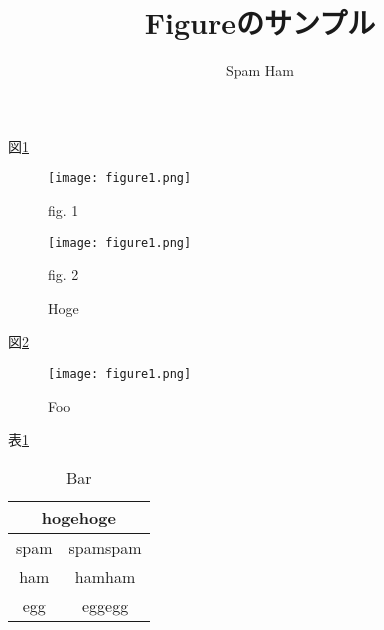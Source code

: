 \documentclass[11pt]{jarticle}
\begin{document}
\title{Figureのサンプル}
\author{Spam Ham}
\date{}
\maketitle

図\ref{1}
\begin{figure}[htbp]
	\begin{center}
		\begin{minipage}{0.48\hsize}
			\begin{center}
				\texttt{[image: figure1.png]}
			\end{center}
			\begin{center}
				fig. 1
			\end{center}
		\end{minipage}		
		\hfil
		\begin{minipage}{0.48\hsize}
			\begin{center}
				\texttt{[image: figure1.png]}
			\end{center}
			\begin{center}
				fig. 2 
			\end{center}
		\end{minipage}
		\caption{Hoge}
		\label{1}
	\end{center}
\end{figure}

図\ref{2}
\begin{figure}[H]
	\begin{center}
		\texttt{[image: figure1.png]}
		\vspace{-0.5cm}
		\caption{Foo}
		\label{2}
	\end{center}
\end{figure}

表\ref{3}
\begin{table}[htbp]
	\centering
	\caption{Bar}
	\label{3}
	\begin{tabular}{|c|c|} \hline
			\multicolumn{2}{|c|}{hogehoge}\\ \hline
		spam & spamspam \\ \hline
		ham & hamham \\ \hline
		egg & eggegg \\ \hline
	\end{tabular}
\end{table}
\end{document}
